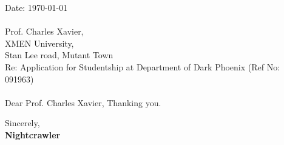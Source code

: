 \documentclass[11pt,a4paper]{letter}
\author{Rohit Suratekar}
\begin{document}
	{\hfill Date: \today}
	~\\\\
	Prof. Charles Xavier,\\
	XMEN University, \\
	Stan Lee road, Mutant Town\\
	
	Re: Application for Studentship at Department of Dark Phoenix {\footnotesize (Ref No: 091963)} \\
	~\\	
	Dear Prof. Charles Xavier,
	\lipsum[2-4]
	Thanking you.
	
	Sincerely,\\
	\textbf{Nightcrawler}\\
	
\end{document}
